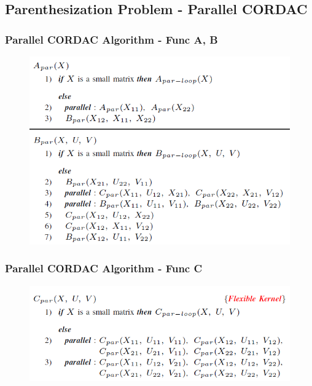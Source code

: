 \subsection{Parenthesization Problem - Parallel CORDAC}
\begin{frame}
    \frametitle{Parallel CORDAC Algorithm - Func A, B}
    \begin{figure}
		\includegraphics[scale=0.5]{figure/fig-parenthesis-parallel-1.png}
	\end{figure}
\end{frame}

\begin{frame}
    \frametitle{Parallel CORDAC Algorithm - Func C}
    \begin{figure}
		\includegraphics[scale=0.5]{figure/fig-parenthesis-parallel-2.png}
	\end{figure}
\end{frame}


